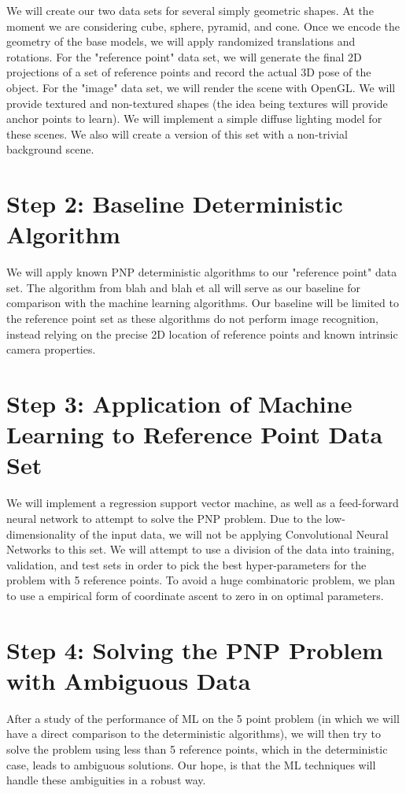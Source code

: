 \documentclass[journal]{IEEEtran}
\begin{document}
We will create our two data sets for several simply geometric shapes. At the moment we are considering cube, sphere, pyramid, and cone.
Once we encode the geometry of the base models, we will apply randomized translations and rotations. For the "reference point" data set,
we will generate the final 2D projections of a set of reference points and record the actual 3D pose of the object. For the "image" data set,
we will render the scene with OpenGL. We will provide textured and non-textured shapes (the idea being textures will provide anchor points
to learn). We will implement a simple diffuse lighting model for these scenes. We also will create a version of this set with a non-trivial background scene.

\section{Step 2: Baseline Deterministic Algorithm}

We will apply known PNP deterministic algorithms to our "reference point" data set. The algorithm from blah and blah et all will serve as our baseline for comparison
with the machine learning algorithms. Our baseline will be limited to the reference point set as these algorithms do not perform image recognition, instead relying on the
precise 2D location of reference points and known intrinsic camera properties.

\section{Step 3: Application of Machine Learning to Reference Point Data Set}

We will implement a regression support vector machine, as well as a feed-forward neural network to attempt to solve the PNP problem. Due to the low-dimensionality
of the input data, we will not be applying Convolutional Neural Networks to this set. We will attempt to use a division of the data into training, validation, and test
sets in order to pick the best hyper-parameters for the problem with 5 reference points. To avoid a huge combinatoric problem, we plan to use a empirical form of
coordinate ascent to zero in on optimal parameters.

\section{Step 4: Solving the PNP Problem with Ambiguous Data}

After a study of the performance of ML on the 5 point problem (in which we will have a direct comparison to the deterministic algorithms), we will then try to solve
the problem using less than 5 reference points, which in the deterministic case, leads to ambiguous solutions. Our hope, is that the ML techniques will handle these
ambiguities in a robust way.
\end{document}
